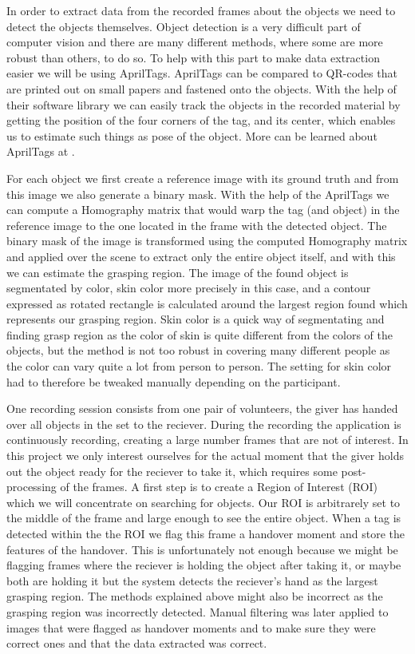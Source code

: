 In order to extract data from the recorded frames about the objects we need to detect the objects themselves. Object detection is a very difficult part of computer vision and there are many different methods, where some are more robust than others, to do so. To help with this part to make data extraction easier we will be using AprilTags. AprilTags can be compared to QR-codes that are printed out on small papers and fastened onto the objects. With the help of their software library we can easily track the objects in the recorded material by getting the position of the four corners of the tag, and its center, which enables us to estimate such things as pose of the object. More can be learned about AprilTags at \textcite{AprilTags}.

For each object we first create a reference image with its ground truth and from this image we also generate a binary mask. With the help of the AprilTags we can compute a Homography matrix that would warp the tag (and object) in the reference image to the one located in the frame with the detected object. The binary mask of the image is transformed using the computed Homography matrix and applied over the scene to extract only the entire object itself, and with this we can estimate the grasping region. The image of the found object is segmentated by color, skin color more precisely in this case, and a contour expressed as rotated rectangle is calculated around the largest region found which represents our grasping region. Skin color is a quick way of segmentating and finding grasp region as the color of skin is quite different from the colors of the objects, but the method is not too robust in covering many different people as the color can vary quite a lot from person to person. The setting for skin color had to therefore be tweaked manually depending on the participant.

One recording session consists from one pair of volunteers, the giver has handed over all objects in the set to the reciever. During the recording the application is continuously recording, creating a large number frames that are not of interest. In this project we only interest ourselves for the actual moment that the giver holds out the object ready for the reciever to take it, which requires some post-processing of the frames. A first step is to create a Region of Interest (ROI) which we will concentrate on searching for objects. Our ROI is arbitrarely set to the middle of the frame and large enough to see the entire object. When a tag is detected within the the ROI we flag this frame a handover moment and store the features of the handover. This is unfortunately not enough because we might be flagging frames where the reciever is holding the object after taking it, or maybe both are holding it but the system detects the reciever's hand as the largest grasping region. The methods explained above might also be incorrect as the grasping region was incorrectly detected. Manual filtering was later applied to images that were flagged as handover moments and to make sure they were correct ones and that the data extracted was correct.

